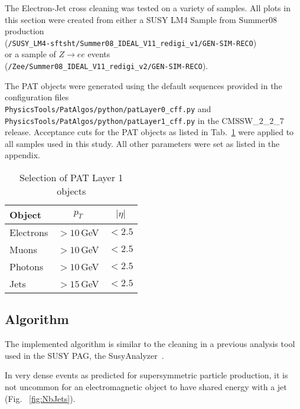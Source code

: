 \documentclass{cmspaper}
\begin{document}
The Electron-Jet cross cleaning was tested on a variety of samples. All
plots in this section were created from either a SUSY LM4 Sample from
Summer08 production\\
(\texttt{/SUSY\_LM4-sftsht/Summer08\_IDEAL\_V11\_redigi\_v1/GEN-SIM-RECO})\\
or a sample of
$Z\rightarrow ee$ events \\(\texttt{/Zee/Summer08\_IDEAL\_V11\_redigi\_v2/GEN-SIM-RECO}).

The PAT objects were generated using the default sequences provided in the
configuration files\\
\texttt{PhysicsTools/PatAlgos/python/patLayer0\_cff.py} and\\
\texttt{PhysicsTools/PatAlgos/python/patLayer1\_cff.py} in the CMSSW\_2\_2\_7
release. Acceptance cuts for the PAT objects as listed in
Tab.~\ref{tab:PATobjCuts} were applied to all samples used in this study.
All other parameters were set as listed in the appendix.

\begin{table}[h]
\caption{Selection of PAT Layer 1 objects}
\begin{center}
\begin{tabular}{l|c|c}
\textbf{Object} & \textbf{$p_T$} & \textbf{$|\eta|$} \\ \hline
    Electrons & $>10$\,GeV & $<2.5$  \\\hline
    Muons     & $>10$\,GeV & $<2.5$  \\\hline
    Photons   & $>10$\,GeV & $<2.5$  \\\hline
    Jets      & $>15$\,GeV & $<2.5$
\end{tabular}
\end{center}
\label{tab:PATobjCuts}
\end{table}

\subsection{Algorithm}
The implemented algorithm is similar to the cleaning in a previous analysis
tool used in the SUSY PAG, the SusyAnalyzer~\cite{wikiSusyAnalyzer}.

In very dense events as predicted for supersymmetric particle production, it is
not uncommon for an electromagnetic object to have shared energy with a jet
(Fig. ~\ref{fig:NbJets}).
\end{document}
